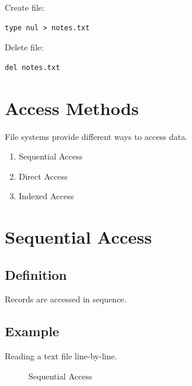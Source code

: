 Create file:

\begin{verbatim}
type nul > notes.txt
\end{verbatim}

Delete file:

\begin{verbatim}
del notes.txt
\end{verbatim}

\section{Access Methods}

File systems provide different ways to access data.

\begin{enumerate}
\item Sequential Access
\item Direct Access
\item Indexed Access
\end{enumerate}

\section{Sequential Access}

\subsection{Definition}

Records are accessed in sequence.

\subsection{Example}

Reading a text file line-by-line.

\begin{figure}[h]
\centering
{}
\caption{Sequential Access}
\end{figure}


